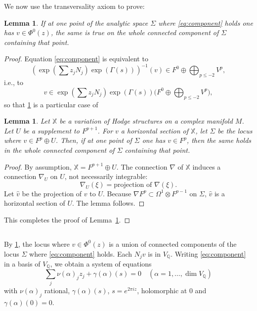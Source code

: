 \documentclass[11pt,a4paper]{article}
\theoremstyle{plain}
\newtheorem{lemma}[theorem]{Lemma}
\theoremstyle{definition}
\begin{document}
We now use the transversality axiom to prove:

\begin{lemma}\label{lem:connected}
If at one point of the analytic space $\Sigma$ where \eqref{eq:component} holds one has $v\in\Phi^0(z)$, the same is true on the whole connected component of $\Sigma$ containing that point.
\end{lemma}

\begin{proof}
Equation \eqref{eq:component} is equivalent to
\[
(\exp(\sum z_j N_j)\exp(\Gamma(s)))^{-1}(v)\in F^0\oplus\bigoplus_{p\leq -2}V^p,
\]
i.e., to
\[
v\in\exp(\sum z_j N_j)\exp(\Gamma(s))\bigl(F^0\oplus\bigoplus_{p\leq -2}V^p\bigr),
\]
so that \ref{lem:connected} is a particular case of

\begin{lemma}\label{lem:variation}
Let $\mathbb{X}$ be a variation of Hodge structures on a complex manifold $M$. Let $U$ be a supplement to $F^{p+1}$. For $v$ a horizontal section of $\mathbb{X}$, let $\Sigma$ be the locus where $v\in F^p\oplus U$. Then, if at one point of $\Sigma$ one has $v\in F^p$, then the same holds in the whole connected component of $\Sigma$ containing that point.
\end{lemma}

\begin{proof}
By assumption, $\mathbb{X}=F^{p+1}\oplus U$. The connection $\nabla$ of $\mathbb{X}$ induces a connection $\nabla_U$ on $U$, not necessarily integrable:
\[
\nabla_U(\xi)=\text{projection of }\nabla(\xi).
\]
Let $\hat{v}$ be the projection of $v$ to $U$. Because $\nabla F^p\subset\Omega^1\otimes F^{p-1}$ on $\Sigma$, $\hat{v}$ is a horizontal section of $U$. The lemma follows.
\end{proof}
\noindent This completes the proof of Lemma~\ref{lem:connected}.
\end{proof}

\subsection{}
By \ref{lem:connected}, the locus where $v\in\Phi^0(z)$ is a union of connected components of the locus $\Sigma$ where \eqref{eq:component} holds. Each $N_j v$ is in $V_{\mathbb{Q}}$. Writing \eqref{eq:component} in a basis of $V_{\mathbb{Q}}$, we obtain a system of equations
\begin{equation}\label{eq:system}
\sum_j \nu(\alpha)_j z_j+\gamma(\alpha)(s)=0\quad (\alpha=1,\dots,\dim V_{\mathbb{Q}})
\end{equation}
with $\nu(\alpha)_j$ rational, $\gamma(\alpha)(s)$, $s=e^{2\pi iz}$, holomorphic at $0$ and $\gamma(\alpha)(0)=0$.
\end{document}
